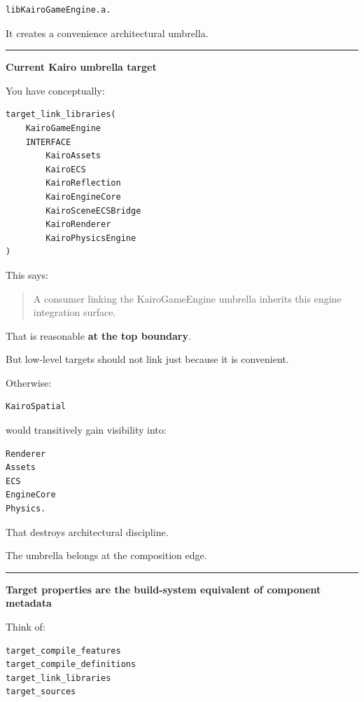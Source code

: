 \begin{verbatim}
libKairoGameEngine.a.
\end{verbatim}

It creates a convenience architectural umbrella.

\begin{center}\rule{0.5\linewidth}{0.5pt}\end{center}

\textbf{Current Kairo umbrella target}

You have conceptually:

\begin{verbatim}
target_link_libraries(
    KairoGameEngine
    INTERFACE
        KairoAssets
        KairoECS
        KairoReflection
        KairoEngineCore
        KairoSceneECSBridge
        KairoRenderer
        KairoPhysicsEngine
)
\end{verbatim}

This says:

\begin{quote}
A consumer linking the KairoGameEngine umbrella inherits this engine integration surface.
\end{quote}

That is reasonable \textbf{at the top boundary}.

But low-level targets should not link  just because it is convenient.

Otherwise:

\begin{verbatim}
KairoSpatial
\end{verbatim}

would transitively gain visibility into:

\begin{verbatim}
Renderer
Assets
ECS
EngineCore
Physics.
\end{verbatim}

That destroys architectural discipline.

The umbrella belongs at the composition edge.

\begin{center}\rule{0.5\linewidth}{0.5pt}\end{center}

\textbf{Target properties are the build-system equivalent of component metadata}

Think of:

\begin{verbatim}
target_compile_features
target_compile_definitions
target_link_libraries
target_sources
\end{verbatim}

